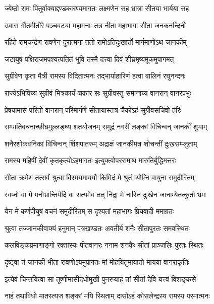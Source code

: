 \twolineshloka
{ज्येष्ठो रामः पितुर्वाक्याद्दण्डकारण्यमागतः}
{लक्ष्मणेन सह भ्रात्रा सीतया भार्यया सह} %

\twolineshloka
{उवास गौतमीतीरे पञ्चवट्यां महामनाः}
{तत्र नीता महाभागा सीता जनकनन्दिनी} %

\twolineshloka
{रहिते रामचन्द्रेण रावणेन दुरात्मना}
{ततो रामोऽतिदुःखार्तो मार्गमाणोऽथ जानकीम्} %

\twolineshloka
{जटायुषं पक्षिराजमपश्यत्पतितं भुवि}
{तस्मै दत्त्वा दिवं शीघ्रमृष्यमूकमुपागमत्} %

\twolineshloka
{सुग्रीवेण कृता मैत्री रामस्य विदितात्मनः}
{तद्भार्याहारिणं हत्वा वालिनं रघुनन्दनः} %

\twolineshloka
{राज्येऽभिषिच्य सुग्रीवं मित्रकार्यं चकार सः}
{सुग्रीवस्तु समानाय्य वानरान् वानरप्रभुः} %

\twolineshloka
{प्रेषयामास परितो वानरान् परिमार्गणे}
{सीतायास्तत्र चैकोऽहं सुग्रीवसचिवो हरिः} %

\twolineshloka
{सम्पातिवचनाच्छीघ्रमुल्लङ्घ्य शतयोजनम्}
{समुद्रं नगरीं लङ्कां विचिन्वन् जानकीं शुभाम्} %

\twolineshloka
{शनैरशोकवनिकां विचिन्वन् शिंशपातरुम्}
{अद्राक्षं जानकीमत्र शोचन्तीं दुःखसम्प्लुताम्} %

\twolineshloka
{रामस्य महिषीं देवीं कृतकृत्योऽहमागतः}
{इत्युक्त्वोपररामाथ मारुतिर्बुद्धिमत्तरः} %

\twolineshloka
{सीता क्रमेण तत्सर्वं श्रुत्वा विस्मयमाययौ}
{किमिदं मे श्रुतं व्योम्नि वायुना समुदीरितम्} %

\twolineshloka
{स्वप्नो वा मे मनोभ्रान्तिर्यदि वा सत्यमेव तत्}
{निद्रा मे नास्ति दुःखेन जानाम्येतत्कुतो भ्रमः} %

\twolineshloka
{येन मे कर्णपीयुषं वचनं समुदीरितम्}
{स दृश्यतां महाभागः प्रियवादी ममाग्रतः} %

\twolineshloka
{श्रुत्वा तज्जानकीवाक्यं हनुमान् पत्रखण्डतः}
{अवतीर्य शनैः सीतापुरतः समवस्थितः} %

\twolineshloka
{कलविङ्कप्रमाणाङ्गो रक्तास्यः पीतवानरः}
{ननाम शनकैः सीतां प्राञ्जलिः पुरतः स्थितः} %

\twolineshloka
{दृष्ट्वा तं जानकी भीता रावणोऽयमुपागतः}
{मां मोहयितुमायातो मायया वानराकृतिः} %

\twolineshloka
{इत्येवं चिन्तयित्वा सा तूष्णीमासीदधोमुखी}
{पुनरप्याह तां सीतां देवि यत्त्वं विशङ्कसे} %

\twolineshloka
{नाहं तथाविधो मातस्त्यज शङ्कां मयि स्थिताम्}
{दासोऽहं कोसलेन्द्रस्य रामस्य परमात्मनः} %

